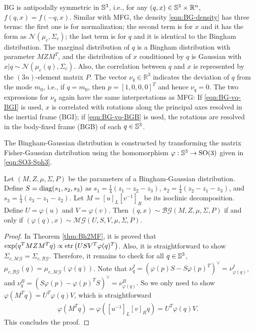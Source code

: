 BG is antipodally symmetric in $\mathbb{S}^3$, i.e., for any $(q,x)\in\mathbb{S}^3\times\mathbb{R}^n$, $f(q,x) = f(-q,x)$.
Similar with MFG, the density \eqref{eqn:BG-density} has three terms:
the first one is for normalization; the second term is for $x$ and it has the form as $\mathcal{N}(\mu_c, \Sigma_c)$; the last term is for $q$ and it is identical to the Bingham distribution.
The marginal distribution of $q$ is a Bingham distribution with parameter $MZM^T$, and the distribution of $x$ conditioned by $q$ is Gaussian with $x|q\sim\mathcal{N}(\mu_c(q), \Sigma_c)$.
Also, the correlation between $q$ and $x$ is represented by the $(3n)$-element matrix $P$.
The vector $\nu_q\in\mathbb{R}^3$ indicates the deviation of $q$ from the mode $m_0$, i.e., if $q=m_0$, then $p = [1,0,0,0]^T$ and hence $\nu_q = 0$.
The two expressions for $\nu_q$ again have the same interpretations as MFG:
If \eqref{eqn:BG-vq-BGI} is used, $x$ is correlated with rotations along the principal axes resolved in the inertial frame (BGI);
if \eqref{eqn:BG-vq-BGB} is used, the rotations are resolved in the body-fixed frame (BGB) of each $q\in\mathbb{S}^3$.

The Bingham-Gaussian distribution is constructed by transforming the matrix Fisher-Gaussian distribution using the homomorphism $\varphi: \mathbb{S}^3\to\mathrm{SO}(3)$ given in \eqref{eqn:SO3-Sph3}.
\begin{theorem} \label{thm:BG-MFG}
	Let $(M,Z,\mu,\Sigma,P)$ be the parameters of a Bingham-Gaussian distribution.
	Define $S = \mathrm{diag}(s_1,s_2,s_3)$ as $s_1 = \tfrac{1}{4}(z_1-z_2-z_3)$, $s_2 = \tfrac{1}{4}(z_2-z_1-z_3)$, and $s_3 = \tfrac{1}{4}(z_3-z_1-z_2)$.
	Let $M = [u]_L[v^{-1}]_R$ be its isoclinic decomposition.
	Define $U = \varphi(u)$ and $V = \varphi(v)$.
	Then $(q,x)\sim\mathcal{BG}(M,Z,\mu,\Sigma,P)$ if and only if $(\varphi(q),x)\sim\mathcal{MG}(U,S,V,\mu,\Sigma,P)$.
\end{theorem}
\begin{proof}
	In Theorem \ref{thm:Bh2MF}, it is proved that $\exp(q^TMZM^Tq) \propto \mathrm{etr}\left( USV^T\varphi(q)^T \right)$.
	Also, it is straightforward to show $\Sigma_{c,\mathcal{MG}} = \Sigma_{c,\mathcal{BG}}$.
	Therefore, it remains to check for all $q\in\mathbb{S}^3$, $\mu_{c,\mathcal{BG}}(q) = \mu_{c,\mathcal{MG}}(\varphi(q))$.
	Note that $\nu_q^I = \allowbreak (\varphi(p)S-S\varphi(p)^T)^\vee = \allowbreak \nu_{\varphi(q)}^I$, and $\nu_q^B = \allowbreak (S\varphi(p)-\varphi(p)^TS)^\vee = \allowbreak \nu_{\varphi(q)}^B$.
	So we only need to show $\varphi(M^Tq) = U^T\varphi(q)V$, which is straightforward
	\begin{align*}
		\varphi(M^Tq) = \varphi([u^{-1}]_L[v]_Rq) = U^T\varphi(q)V.
	\end{align*}
	This concludes the proof.
\end{proof}

